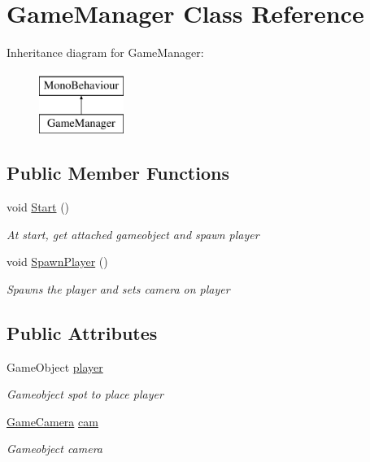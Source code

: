 \hypertarget{classGameManager}{\section{Game\-Manager Class Reference}
\label{classGameManager}
}
Inheritance diagram for Game\-Manager\-:\begin{figure}[H]
\begin{center}
\leavevmode
\includegraphics[height=2.000000cm]{classGameManager}
\end{center}
\end{figure}
\subsection*{Public Member Functions}
\begin{DoxyCompactItemize}
\item 
void \hyperlink{classGameManager_a5ccfacd027ad08eeb4ff1f25a7f59c98}{Start} ()
\begin{DoxyCompactList}\small\item\em At start, get attached gameobject and spawn player \end{DoxyCompactList}\item 
void \hyperlink{classGameManager_a62960104332e06a3324eb2cc78ce4317}{Spawn\-Player} ()
\begin{DoxyCompactList}\small\item\em Spawns the player and sets camera on player \end{DoxyCompactList}\end{DoxyCompactItemize}
\subsection*{Public Attributes}
\begin{DoxyCompactItemize}
\item 
Game\-Object \hyperlink{classGameManager_abe8e79771775bc67c63c4ac43349dc8a}{player}
\begin{DoxyCompactList}\small\item\em Gameobject spot to place player \end{DoxyCompactList}\item 
\hyperlink{classGameCamera}{Game\-Camera} \hyperlink{classGameManager_ad95999a7d419e9262f7f22fdad69df9d}{cam}
\begin{DoxyCompactList}\small\item\em Gameobject camera \end{DoxyCompactList}\end{DoxyCompactItemize}



